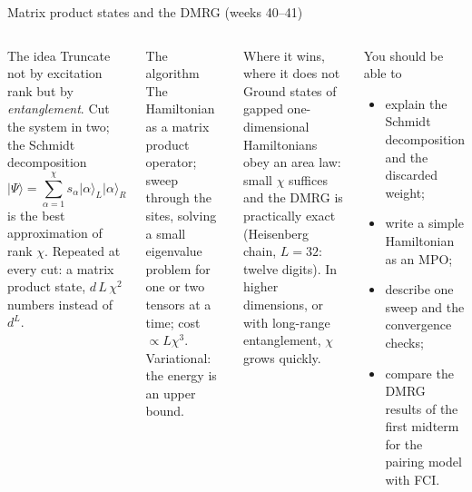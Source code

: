 \documentclass[aspectratio=169,10pt]{beamer}
\newcommand{\ket}[1]{\vert #1\rangle}
\begin{document}
\begin{frame}[shrink=4]{Matrix product states and the DMRG (weeks 40--41)}
\small
\begin{columns}[T]
\begin{block}{The idea}
Truncate not by excitation rank but by \emph{entanglement}. Cut the system in two; the Schmidt decomposition
\[
 \ket{\Psi}=\sum_{\alpha=1}^{\chi}s_\alpha\ket{\alpha}_L\ket{\alpha}_R
\]
is the best approximation of rank $\chi$. Repeated at every cut: a matrix product state, $d\,L\,\chi^2$ numbers instead of $d^L$.
\end{block}
\begin{block}{The algorithm}
The Hamiltonian as a matrix product operator; sweep through the sites, solving a small eigenvalue problem for one or two tensors at a time; cost $\propto L\chi^3$. Variational: the energy is an upper bound.
\end{block}
\begin{block}{Where it wins, where it does not}
Ground states of gapped one-dimensional Hamiltonians obey an area law: small $\chi$ suffices and the DMRG is practically exact (Heisenberg chain, $L=32$: twelve digits). In higher dimensions, or with long-range entanglement, $\chi$ grows quickly.
\end{block}
\begin{block}{You should be able to}
\begin{itemize}
\item explain the Schmidt decomposition and the discarded weight;
\item write a simple Hamiltonian as an MPO;
\item describe one sweep and the convergence checks;
\item compare the DMRG results of the first midterm for the pairing model with FCI.
\end{itemize}
\end{block}
\end{columns}
\end{frame}
\end{document}
